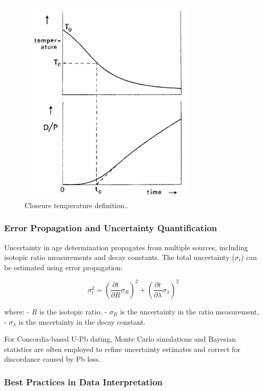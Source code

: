 \documentclass{article}
\begin{document}
\begin{figure}[htbp]
    \centering
    \includegraphics[width=0.75\textwidth]{Closure_temp.png}
    \caption{Closeure temperature definition.\cite{Dodson1973}.}
    \label{fig:Closure_temp}
\end{figure}

\subsubsection*{Error Propagation and Uncertainty Quantification}

Uncertainty in age determination propagates from multiple sources, including isotopic ratio measurements and decay constants. The total uncertainty (\(\sigma_t\)) can be estimated using error propagation:

\[
\sigma_t^2 = \left( \frac{\partial t}{\partial R} \sigma_R \right)^2 + \left( \frac{\partial t}{\partial \lambda} \sigma_\lambda \right)^2
\]

where:
- \( R \) is the isotopic ratio,
- \( \sigma_R \) is the uncertainty in the ratio measurement,
- \( \sigma_\lambda \) is the uncertainty in the decay constant.

For Concordia-based U-Pb dating, Monte Carlo simulations and Bayesian statistics are often employed to refine uncertainty estimates and correct for discordance caused by Pb loss.

\subsubsection*{Best Practices in Data Interpretation}
\end{document}
